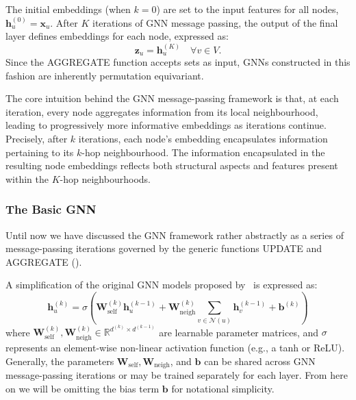The initial embeddings (when $ k=0 $) are set to the input features for all nodes, $ \mathbf{h}_u^{(0)} = \mathbf{x}_u $. After $ K $ iterations of GNN message passing, the output of the final layer defines embeddings for each node, expressed as:
\begin{equation*}
    \mathbf{z}_u=\mathbf{h}_u^{(K)} \quad \forall v \in V.
\end{equation*}
Since the AGGREGATE function accepts sets as input, GNNs constructed in this fashion are inherently permutation equivariant.

The core intuition behind the GNN message-passing framework is that, at each iteration, every node aggregates information from its local neighbourhood, leading to progressively more informative embeddings as iterations continue. Precisely, after $ k $ iterations, each node's embedding encapsulates information pertaining to its $ k $-hop neighbourhood. The information encapsulated in the resulting node embeddings reflects both structural aspects and features present within the $ K $-hop neighbourhoods.

\subsubsection{The Basic GNN}
Until now we have discussed the GNN framework rather abstractly as a series of message-passing iterations governed by the generic functions UPDATE and AGGREGATE (). 

A simplification of the original GNN models proposed by~\cite{Merkwirth2005automaticGenerationComplementaryDescriptorsMolecularGraphNetworks}\cite{scarselli2008graphNeuralNetworkModel} is expressed as:
\begin{equation}\label{eq:basicGNN}
    \mathbf{h}_u^{(k)} = \sigma\left(\mathbf{W}_\text{self}^{(k)}\mathbf{h}_u^{(k-1)} + \mathbf{W}_\text{neigh}^{(k)}\sum_{v\in\mathcal{N}(u)}\mathbf{h}_v^{(k-1)} + \mathbf{b}^{(k)}\right)
\end{equation}
where $ \mathbf{W}_\text{self}^{(k)}, \mathbf{W}_\text{neigh}^{(k)} \in \mathbb{R}^{d^{(k)}\times d^{(k-1)}} $ are learnable parameter matrices, and $ \sigma $ represents an element-wise non-linear activation function (e.g., a tanh or ReLU). Generally, the parameters $ \mathbf{W}_\text{self}, \mathbf{W}_\text{neigh} $, and $\mathbf{b}$ can be shared across GNN message-passing iterations or may be trained separately for each layer. From here on we will be omitting the bias term $\mathbf{b}$ for notational simplicity.

